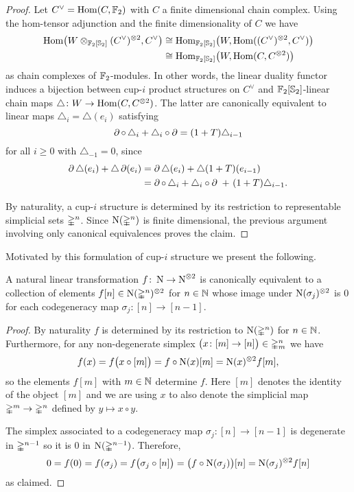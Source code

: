\begin{proof}
	Let $C^\vee = \mathrm{Hom}(C, {\mathbb{F}_2})$ with $C$ a finite dimensional chain complex.
	Using the hom-tensor adjunction and the finite dimensionality of $C$ we have
	\begin{align*}
	\mathrm{Hom} \big(W \otimes_{{\mathbb{F}_2}[\mathbb{S}_2]} (C^\vee)^{\otimes 2}, C^\vee \big) & \cong
	\mathrm{Hom}_{{\mathbb{F}_2}[\mathbb{S}_2]} \big( W, \mathrm{Hom}((C^\vee)^{\otimes 2}, C^\vee) \big) \\ & \cong
	\mathrm{Hom}_{{\mathbb{F}_2}[\mathbb{S}_2]} \big( W, \mathrm{Hom}(C, C^{\otimes 2}) \big)
	\end{align*}
	as chain complexes of ${\mathbb{F}_2}$-modules.
	In other words, the linear duality functor induces a bijection between \mbox{cup-$i$} product structures on $C^\vee$ and ${\mathbb{F}_2}[\mathbb{S}_2]$-linear chain maps $\triangle \colon W \to \mathrm{Hom}(C, C^{\otimes 2})$.
	The latter are canonically equivalent to linear maps $\triangle_i = \triangle(e_i)$ satisfying
	\[
	\operatorname{\partial} \circ \, \triangle_i + \triangle_i \circ \operatorname{\partial} =
	(1+T) \triangle_{i-1}
	\]
	for all $i \geq 0$ with $\triangle_{-1} = 0$, since
	\begin{align*}
	\operatorname{\partial} \triangle (e_i) + \triangle \operatorname{\partial}(e_i) &=
	\operatorname{\partial} \triangle (e_i) + \triangle (1+T) (e_{i-1}) \\ &=
	\operatorname{\partial} \circ \, \triangle_i + \triangle_i \circ \operatorname{\partial} \ +\ (1+T) \triangle_{i-1}.
	\end{align*}

	By naturality, a \mbox{cup-$i$} structure is determined by its restriction to representable simplicial sets $\mathbb{\Delta}^n$.
	Since $\operatorname{N}(\mathbb{\Delta}^n)$ is finite dimensional, the previous argument involving only canonical equivalences proves the claim.
\end{proof}

Motivated by this formulation of \mbox{cup-$i$} structure we present the following.

\begin{lemma}\label{l:natural}
	A natural linear transformation $f \colon \operatorname{N} \to \operatorname{N}^{\otimes 2}$ is canonically equivalent to a collection of elements $f[n] \in \operatorname{N}(\mathbb{\Delta}^n)^{\otimes 2}$	for $n \in \mathbb{N}$ whose image under $\operatorname{N}(\sigma_j)^{\otimes 2}$ is $0$
	for each codegeneracy map $\sigma_j \colon [n] \to [n-1]$.
\end{lemma}

\begin{proof}
	By naturality $f$ is determined by its restriction to $\operatorname{N}(\mathbb{\Delta}^n)$ for $n \in \mathbb{N}$.
	Furthermore, for any non-degenerate simplex $\big( x \colon [m] \to [n] \big) \in \mathbb{\Delta}^n_m$ we have
	\[
	f(x) = f \big( x \circ [m] \big) =
	f \circ \operatorname{N}(x) [m] =
	\operatorname{N}(x)^{\otimes 2} f[m],
	\]
	so the elements $f[m]$ with $m \in \mathbb{N}$ determine $f$.
	Here $[m]$ denotes the identity of the object $[m]$ and we are using $x$ to also denote the simplicial map $\mathbb{\Delta}^m \to \mathbb{\Delta}^n$ defined by $y \mapsto x \circ y$.

	The simplex associated to a codegeneracy map $\sigma_j \colon [n] \to [n-1]$ is degenerate in $\mathbb{\Delta}^{n-1}$ so it is $0$ in $\operatorname{N}(\mathbb{\Delta}^{n-1})$.
	Therefore,
	\[
	0 = f(0) = f(\sigma_j) =
	f \big( \sigma_j \circ [n] \big) =
	\big( f \circ \operatorname{N}(\sigma_j) \big) [n] =
	\operatorname{N}(\sigma_j)^{\otimes 2} f[n]
	\]
	as claimed.
\end{proof}

